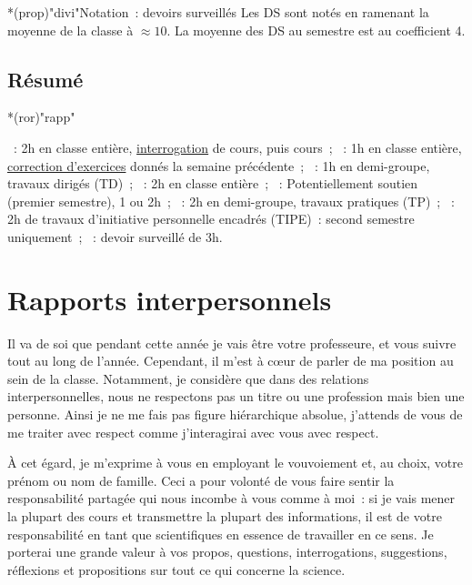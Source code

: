 \documentclass[10pt, garamond]{book}
\begin{document}
\begin{tcb}*(prop)"divi"{Notation~: devoirs surveillés}
	Les DS sont notés en ramenant la moyenne de la classe à $\approx 10$. La
	moyenne des DS au semestre est au coefficient 4.
\end{tcb}

\subsection{Résumé}
\begin{tcb}*(ror)"rapp"{}
	\begin{itemize}[label=$\diamond$, leftmargin=10pt]
		~: 2h en classe entière, \ul{interrogation} de
		cours, puis cours~;
		~: 1h en classe entière, \ul{correction
			d'exercices}
		donnés la semaine précédente~;
		~: 1h en demi-groupe, travaux dirigés (TD)~;
		~: 2h en classe entière~;
		~: Potentiellement soutien (premier semestre), 1
		ou 2h~;
		~: 2h en demi-groupe, travaux pratiques (TP)~;
		~: 2h de travaux d'initiative personnelle
		encadrés (TIPE)~: second semestre uniquement~;
		~: devoir surveillé de 3h.
	\end{itemize}
\end{tcb}

\section{Rapports interpersonnels}

Il va de soi que pendant cette année je vais être votre professeure, et vous
suivre tout au long de l'année. Cependant, il m'est à cœur de parler de ma
position au sein de la classe. Notamment, je considère que dans des relations
interpersonnelles, nous ne respectons pas un titre ou une profession mais bien
une personne. Ainsi je ne me fais pas figure hiérarchique absolue, j'attends de
vous de me traiter avec respect comme j'interagirai avec vous avec respect.

À cet égard, je m'exprime à vous en employant le vouvoiement et, au choix, votre
prénom ou nom de famille. Ceci a pour volonté de vous faire sentir la
responsabilité partagée qui nous incombe à vous comme à moi~: si je vais mener
la plupart des cours et transmettre la plupart des informations, il est de votre
responsabilité en tant que scientifiques en essence de travailler en ce sens. Je
porterai une grande valeur à vos propos, questions, interrogations, suggestions,
réflexions et propositions sur tout ce qui concerne la science.
\end{document}

